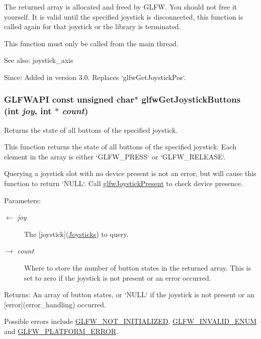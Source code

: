 The returned array is allocated and freed by GLFW. You should not free it yourself. It is valid until the specified joystick is disconnected, this function is called again for that joystick or the library is terminated.

This function must only be called from the main thread.

\begin{Desc}
\item[See also:]joystick\_\-axis\end{Desc}
\begin{Desc}
\item[Since:]Added in version 3.0. Replaces `glfwGetJoystickPos`. \end{Desc}
\hypertarget{group__input_g3951bea72b5fb4870b1aa0e5c2e9c903}{
\subsubsection[glfwGetJoystickButtons]{\setlength{\rightskip}{0pt plus 5cm}GLFWAPI const unsigned char$\ast$ glfwGetJoystickButtons (int {\em joy}, \/  int $\ast$ {\em count})}}
\label{group__input_g3951bea72b5fb4870b1aa0e5c2e9c903}


Returns the state of all buttons of the specified joystick. 

This function returns the state of all buttons of the specified joystick. Each element in the array is either `GLFW\_\-PRESS` or `GLFW\_\-RELEASE`.

Querying a joystick slot with no device present is not an error, but will cause this function to return `NULL`. Call \hyperlink{group__input_g7f81f22f355f4b7d315caf73cdfd9906}{glfwJoystickPresent} to check device presence.

\begin{Desc}
\item[Parameters:]
\begin{description}
\item[\mbox{$\leftarrow$} {\em joy}]The \mbox{[}joystick\mbox{]}(\hyperlink{group__joysticks}{Joysticks}) to query. \item[\mbox{$\rightarrow$} {\em count}]Where to store the number of button states in the returned array. This is set to zero if the joystick is not present or an error occurred. \end{description}
\end{Desc}
\begin{Desc}
\item[Returns:]An array of button states, or `NULL` if the joystick is not present or an \mbox{[}error\mbox{]}(error\_\-handling) occurred.\end{Desc}
Possible errors include \hyperlink{group__errors_g2374ee02c177f12e1fa76ff3ed15e14a}{GLFW\_\-NOT\_\-INITIALIZED}, \hyperlink{group__errors_g76f6bb9c4eea73db675f096b404593ce}{GLFW\_\-INVALID\_\-ENUM} and \hyperlink{group__errors_gd44162d78100ea5e87cdd38426b8c7a1}{GLFW\_\-PLATFORM\_\-ERROR}.

